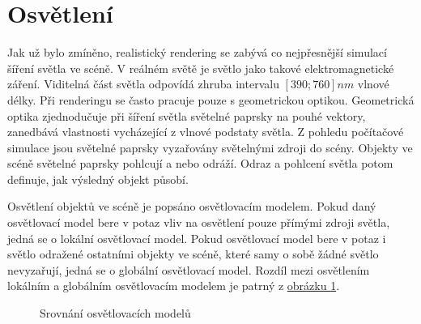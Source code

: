 \documentclass[czech,master]{diploma}
\newcommand{\interval}[1]{\left[{#1}\right]}
\begin{document}
\section{Osvětlení}
Jak už bylo zmíněno, realistický rendering se zabývá co nejpřesnější simulací šíření světla ve scéně. V reálném světě je světlo jako takové elektromagnetické záření. Viditelná část světla odpovídá zhruba intervalu $\interval{390;760}nm$ vlnové délky. Při renderingu se často pracuje pouze s geometrickou optikou. Geometrická optika zjednodučuje při šíření světla světelné paprsky na pouhé vektory, zanedbává vlastnosti vycházející z vlnové podstaty světla. Z pohledu počítačové simulace jsou světelné paprsky vyzařovány světelnými zdroji do scény. Objekty ve scéně světelné paprsky pohlcují a nebo odráží. Odraz a pohlcení světla potom definuje, jak výsledný objekt působí. \par
Osvětlení objektů ve scéně je popsáno osvětlovacím modelem. Pokud daný osvětlovací model bere v potaz vliv na osvětlení pouze přímými zdroji světla, jedná se o lokální osvětlovací model. Pokud osvětlovací model bere v potaz i světlo odražené ostatními objekty ve scéně, které samy o sobě žádné světlo nevyzařují, jedná se o globální osvětlovací model. Rozdíl mezi osvětlením lokálním a globálním osvětlovacím modelem je patrný z \hyperref[fig:localVsGlobalIllum]{obrázku \ref{fig:localVsGlobalIllum}}.

\begin{figure}[ht]%
  \centering
  \qquad
  \caption{Srovnání osvětlovacích modelů}%
  \label{fig:localVsGlobalIllum}%
\end{figure}
\end{document}
